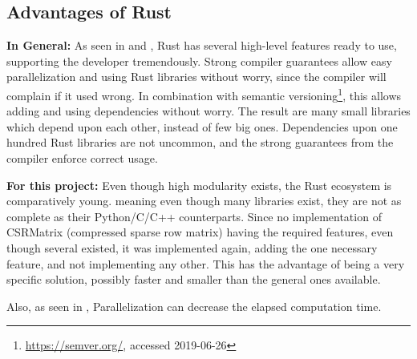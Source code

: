 



\subsection{Advantages of Rust}\label{sec:RustAdvantages}


\textbf{In General:} As seen in  and
, Rust has several high-level features ready to use,
supporting the developer tremendously. Strong compiler guarantees allow easy
parallelization and using Rust libraries without worry, since the compiler will
complain if it used wrong. In combination with semantic
versioning\footnote{\url{https://semver.org/}, accessed 2019-06-26}, this
allows adding and using dependencies without worry. The result are many small
libraries which depend upon each other, instead of few big ones. Dependencies
upon one hundred Rust libraries are not uncommon, and the strong guarantees
from the compiler enforce correct usage.

\textbf{For this project:} Even though high modularity exists, the Rust
ecosystem is comparatively young. meaning even though many libraries exist,
they are not as complete as their Python/C/C++ counterparts. Since no
implementation of CSRMatrix (compressed sparse row matrix) having the
required features, even though several existed, it was implemented again,
adding the one necessary feature, and not implementing any other. This has
the advantage of being a very specific solution, possibly faster and smaller
than the general ones available.

Also, as seen in , Parallelization can decrease
the elapsed computation time.



